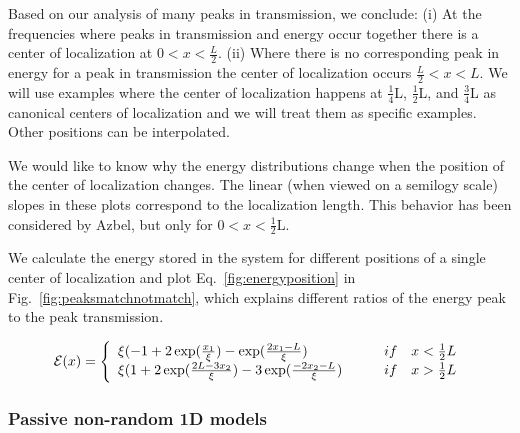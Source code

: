 Based on our analysis of many peaks in transmission, we conclude:
(i) At the frequencies where peaks in transmission 
and energy occur together there is a center of localization at $ 0 < x < \frac{L}{2}$. 
(ii) Where there is no corresponding peak in energy 
for a peak in transmission the center of localization occurs $ \frac{L}{2}<x<L $. 
We will use examples where the center of localization
happens at $ \frac{1}{4} $L, $ \frac{1}{2} $L, 
and $ \frac{3}{4} $L as canonical centers of localization
and we will treat them as specific examples.  Other 
positions can be interpolated.

We would like to know why the energy distributions 
change when the position of the center of localization changes.
The linear (when viewed on a semilogy scale) slopes
in these plots correspond to the localization length.
This behavior has been considered by Azbel, but only for $ 0 < x < \frac{1}{2} $L.~\cite{1983_Azbel_zeroTemp}

We calculate the energy stored in the system for 
different positions of a single center of localization
and plot Eq.~\ref{fig:energyposition} in 	%
Fig.~\ref{fig:peaksmatchnotmatch}, which explains
different ratios of the energy peak to the peak transmission.

\begin{equation}
{\cal E}(x) = \left\{
\begin{array}{l l}
  \xi (-1 + 2\exp( \frac{x_1}{\xi} ) -  \exp( \frac{2 x_1-L}{\xi} )      &  \quad \quad  if \quad x < \frac{1}{2}L  \\
  \xi ( 1 + 2\exp( \frac{2 L-3 x_2}{\xi} ) - 3\exp( \frac{-2 x_2-L}{\xi} )  & \quad \quad if \quad x > \frac{1}{2}L
\end{array} \right.
\label{fig:energyposition}
\end{equation}

\subsubsection {Passive non-random 1D models}

